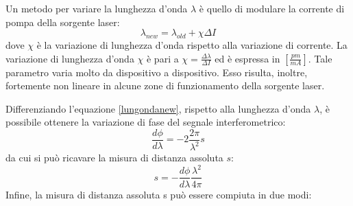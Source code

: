 Un metodo per variare la lunghezza d'onda $\lambda$ è quello di modulare la corrente di pompa della sorgente laser:
\begin{equation}
		\lambda_{new}=\lambda_{old}+\chi\Delta I
		\label{lungondanew}
\end{equation}
dove $\chi$ è la variazione di lunghezza d'onda rispetto alla variazione di corrente. La variazione di lunghezza d'onda $\chi$ è pari a $\chi = \frac{\Delta \lambda}{\Delta I}$ ed è espressa in $\left [ \frac{pm}{mA} \right ]$. Tale parametro varia molto da dispositivo a dispositivo. Esso risulta, inoltre, fortemente non lineare in alcune zone di funzionamento della sorgente laser. 

Differenziando l'equazione \ref{lungondanew}, rispetto alla lunghezza d'onda $\lambda$, è possibile ottenere la variazione di fase del segnale interferometrico:
\begin{equation}
	\frac{d\phi}{d\lambda}=-2\frac{2\pi}{\lambda^2}s
\end{equation}
da cui si può ricavare la misura di distanza assoluta $s$:
\begin{equation}
	s=-\frac{d\phi}{d\lambda}\frac{\lambda^2}{4\pi}
\end{equation}
Infine, la misura di distanza assoluta s può essere compiuta in due modi:
